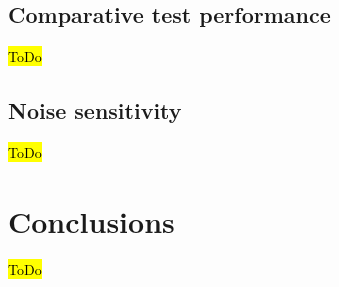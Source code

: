 \documentclass{article}
\begin{document}
\subsection{Comparative test performance}

\hl{ToDo}

\subsection{Noise sensitivity}

\hl{ToDo}


\section{Conclusions}

\hl{ToDo}



\end{document}
